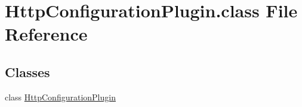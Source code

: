 \hypertarget{HttpConfigurationPlugin_8class}{\section{Http\-Configuration\-Plugin.\-class File Reference}
\label{HttpConfigurationPlugin_8class}
}
\subsection*{Classes}
\begin{DoxyCompactItemize}
\item 
class \hyperlink{classHttpConfigurationPlugin}{Http\-Configuration\-Plugin}
\end{DoxyCompactItemize}
